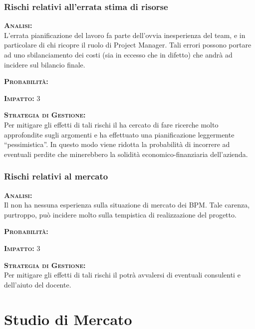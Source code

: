 \subsection{Rischi relativi all'errata stima di risorse}
\begin{description}
	\item{\scshape\bfseries Analisi:}\\
	L'errata pianificazione del lavoro fa parte dell'ovvia inesperienza del team, e in particolare di chi ricopre il ruolo di Project Manager. Tali errori possono portare ad uno sbilanciamento dei costi (sia in eccesso che in difetto) che andrà ad incidere sul bilancio finale.
	\item{\scshape\bfseries Probabilità:} \med
	\item{\scshape\bfseries Impatto:} 3 
	\item{\scshape\bfseries Strategia di Gestione:}\\
	Per mitigare gli effetti di tali rischi il  ha cercato di fare ricerche molto approfondite sugli argomenti e ha effettuato una pianificazione leggermente ``pessimistica''. In questo modo viene ridotta la probabilità di incorrere ad eventuali perdite che minerebbero la solidità economico-finanziaria dell'azienda.
\end{description}

\subsection{Rischi relativi al mercato}
\begin{description}
	\item{\scshape\bfseries Analisi:}\\
	Il  non ha nessuna esperienza sulla situazione di mercato dei  BPM\@. Tale carenza, purtroppo, può incidere molto sulla tempistica di realizzazione del progetto.
	\item{\scshape\bfseries Probabilità:} \hi
	\item{\scshape\bfseries Impatto:} 3 
	\item{\scshape\bfseries Strategia di Gestione:}\\
	Per mitigare gli effetti di tali rischi il  potrà avvalersi di eventuali consulenti e dell'aiuto del docente.
\end{description}	


\chapter{Studio di Mercato}
